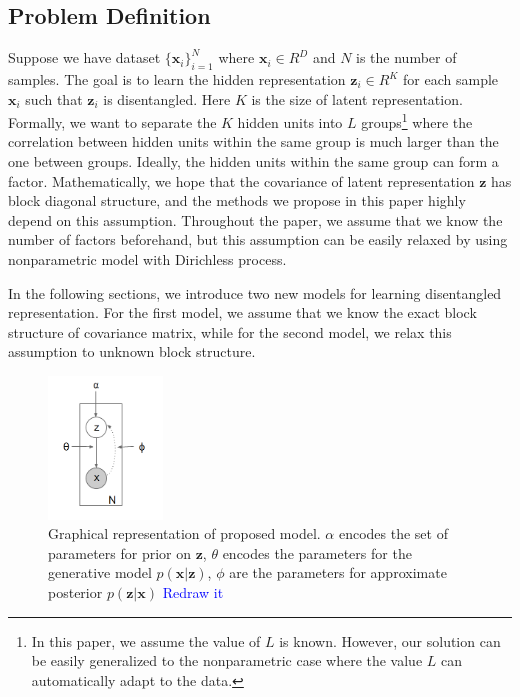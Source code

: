 \subsection{Problem Definition}
Suppose we have dataset $\{\mathbf{x}_i\}_{i=1}^{N}$ where $\mathbf{x}_i\in R^D$ and $N$ is the number of samples. The goal is to learn the hidden representation $\mathbf{z}_i\in R^K$ for each sample $\mathbf{x}_i$ such that $\mathbf{z}_i$ is disentangled. Here $K$ is the size of latent representation.
Formally, we want to separate the $K$ hidden units into $L$ groups\footnote{In this paper, we assume the value of $L$ is known. However, our solution can be easily generalized to the nonparametric case where the value $L$ can automatically adapt to the data.} where the correlation between hidden units within the same group is much larger than the one between groups. Ideally, the hidden units within the same group can form a factor.
Mathematically, we hope that the covariance of latent representation $\mathbf{z}$ has block diagonal structure, and the methods we propose in this paper highly depend on this assumption. Throughout the paper, we assume that we know the number of factors beforehand, but this assumption can be easily relaxed by using nonparametric model with Dirichless process.

In the following sections, we introduce two new models for learning disentangled representation. For the first model, we assume that we know the exact block structure of covariance matrix, while for the second model, we relax this assumption to unknown block structure.

\begin{figure}[hb]
  \centering
  \includegraphics[width=1.2in]{images/model.png}
  \caption[]
   {Graphical representation of proposed model. $\alpha$ encodes the set of parameters for prior on $\mathbf{z}$, $\theta$ encodes the parameters for the generative model $p(\mathbf{x}|\mathbf{z})$, $\phi$ are the parameters for approximate posterior $p(\mathbf{z}|\mathbf{x})$ \textcolor{blue}{Redraw it}}
  \label{fig:model}
\end{figure}

